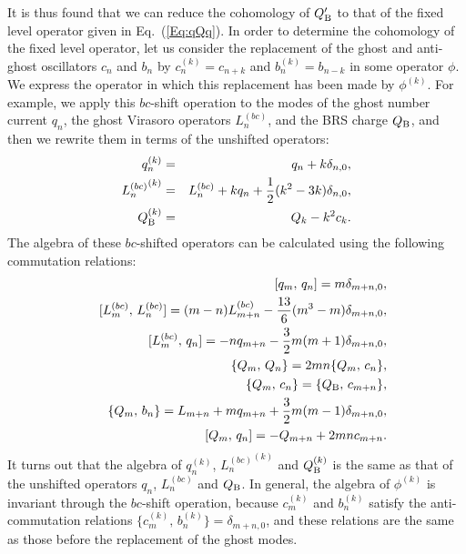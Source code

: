 \documentclass[a4paper,seceq,preprint]{ptptex}
\newcommand{\Q}{Q_{\rm B}}
\newcommand{\half}{\frac{1}{2}}
\begin{document}
It is thus found that we can reduce the cohomology of $\Q'$ to that of
the fixed level operator given in Eq.~(\ref{Eq:qQq}). In order to 
determine the cohomology of the fixed level operator,
let us consider
the replacement of the ghost and anti-ghost oscillators $c_n$ and $b_n$
by $c^{(k)}_n = c_{n+k}$ and $b^{(k)}_n=b_{n-k}$ in some 
operator $\phi$. 
We express the operator in which this replacement has been made 
by $\phi^{(k)}$.
For example, we apply
this $bc$-shift operation to the modes of the ghost number current $q_n$,
the ghost Virasoro operators $L_n^{(bc)}$, and the BRS charge $\Q$, and
then we rewrite them in terms of the
unshifted operators:
\begin{eqnarray}
q_n^{(k)}&=& q_n + k \delta_{n,0}, \\
{L_n^{(bc)}}^{(k)} &=& L_n^{(bc)}+k q_n +\half (k^2-3k) \delta_{n,0},\\
\label{Eq:BRSk}
\Q^{(k)} &=& Q_k -k^2 c_k.
\end{eqnarray}
The algebra of these $bc$-shifted operators can be calculated using 
the following commutation relations:
\begin{eqnarray}
 && [q_m,\,q_n ] = m \delta_{m+n,0}, \\
 && [L_m^{(bc)},\,L_n^{(bc)}] = (m-n)L_{m+n}^{(bc)}
    -\frac{13}{6}(m^3-m)\delta_{m+n,0}, \\
 && [L_m^{(bc)},\,q_n]=-n q_{m+n} -\frac{3}{2}m(m+1)\delta_{m+n,0}, \\
 && \{Q_m,\,Q_n\}=2mn\{Q_m,\,c_n\}, \\
 && \{Q_m,\,c_n\}=\{\Q,\,c_{m+n}\}, \\
 && \{Q_m,\,b_n\}=L_{m+n}+m q_{m+n}
    +\frac{3}{2}m(m-1)\delta_{m+n,0}, \\
 && [Q_m,\,q_n] = -Q_{m+n} + 2mn c_{m+n}.
\end{eqnarray}
It turns out that the algebra of $q_n^{(k)}$, ${L_n^{(bc)}}^{(k)}$ 
and $\Q^{(k)}$ is the same as that 
of the unshifted operators $q_n$, $L_n^{(bc)}$ and $\Q$.
In general, the algebra of $\phi^{(k)}$ is invariant 
through the $bc$-shift operation, because $c_m^{(k)}$ and $b_n^{(k)}$
satisfy the anti-commutation 
relations $\{c_m^{(k)},\,b_n^{(k)}\}=\delta_{m+n,0}$, and these
relations are the same as those before the replacement of the ghost modes.
\end{document}
